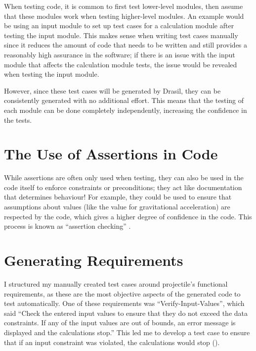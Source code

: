 When testing code, it is common to first test lower-level modules, then assume
that these modules work when testing higher-level modules. An example would be
using an input module to set up test cases for a calculation module after
testing the input module. This makes sense when writing test cases manually
since it reduces the amount of code that needs to be written and still provides
a reasonably high assurance in the software; if there is an issue with the
input module that affects the calculation module tests, the issue would be
revealed when testing the input module.

However, since these test cases will be generated by Drasil, they can be
consistently generated with no additional effort. This means that the testing
of each module can be done completely independently, increasing the confidence
in the tests.

\section{The Use of Assertions in Code}
\label{chap:dev-proc:code-assertions}

While assertions are often only used when testing, they can also be used in
the code itself to enforce constraints or preconditions; they act like
documentation that determines behaviour! For example, they could be used to
ensure that assumptions about values (like the value for gravitational
acceleration) are respected by the code, which gives a higher degree of
confidence in the code. This process is known as ``assertion checking''
\citep{LahiriEtAl2013} .

\section{Generating Requirements}
\label{chap:dev-proc:gen-reqs}

I structured my manually created test cases around \acs{projectile}'s functional
requirements, as these are the most objective aspects of the generated code to
test automatically. One of these requirements was ``Verify-Input-Values'',
which said ``Check the entered input values to ensure that they do not exceed
the data constraints. If any of the input values are out of bounds, an error
message is displayed and the calculations stop.'' This led me to develop a test
case to ensure that if an input constraint was violated, the
calculations would stop ().


